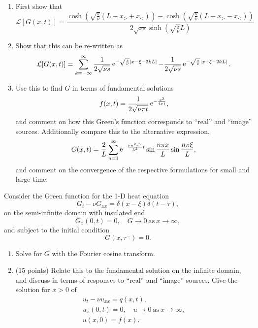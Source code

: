 {\begin{Exercise}
  \begin{enumerate} 
  \item 
    First show that 
    \[ 
    \mathcal{L}[G(x,t)] = \frac{  
      \cosh \left( \sqrt{ \frac{s}{\nu} } (L - x_> + x_<) \right)
      - \cosh \left( \sqrt{ \frac{s}{\nu} } (L - x_> - x_<) \right) }
    { 2 \sqrt{\nu s} \sinh \left( \sqrt{ \frac{s}{\nu} } L \right) }
    \]
    
  \item 
    Show that this can be re-written as 
    \[ 
    \mathcal{L}[G(x,t)] = \sum_{k=-\infty}^{\infty} \frac{1}{2 \sqrt{\nu s}} \mathop{\mathrm{e}}\nolimits^{- \sqrt{\frac{s}{\nu}}|x-\xi-2kL|} 
    - \frac{1}{2 \sqrt{\nu s}} \mathop{\mathrm{e}}\nolimits^{- \sqrt{\frac{s}{\nu}}|x+\xi-2kL|}.
    \]

  \item 
    Use this to find $G$ in terms of fundamental solutions
    \[  
    f(x,t) = \frac{1}{2 \sqrt{\nu \pi t}} \mathop{\mathrm{e}}\nolimits^{-\frac{x^2}{4 \nu t}} ,
    \]
    and comment on how this Green's function corresponds to ``real'' and 
    ``image'' sources. Additionally compare this to the alternative 
    expression,
    \[ 
    G(x,t) = \frac{2}{L} \sum_{n=1}^{\infty} \mathop{\mathrm{e}}\nolimits^{-\frac{\nu n^2 \pi^2}{L^2} t} 
    \sin{\frac{n \pi x}{L}} \sin{\frac{n \pi \xi}{L}},
    \]
    and comment on the convergence of the respective formulations for small 
    and large time. 
  \end{enumerate} 
\end{Exercise}










\begin{Exercise}
  Consider the Green function for the 1-D heat equation 
  \[ 
  G_t - \nu G_{xx} = \delta(x-\xi) \delta(t-\tau), 
  \]
  on the semi-infinite domain with insulated end
  \[ 
  G_x(0,t) = 0, \quad G \to 0\ \mathrm{as}\ x \to \infty,
  \] 
  and subject to the initial condition
  \[ 
  G(x,\tau^-)=0 .
  \]

  \begin{enumerate} 
  \item 
    Solve for $G$ with the Fourier cosine transform.
  \item 
    (15 points) Relate this to the fundamental solution on the infinite domain, 
    and discuss in terms of responses to ``real'' and ``image'' sources. 
    Give the solution for $x > 0$ of
    \begin{gather*}
      u_t - \nu u_{xx} = q(x,t), 
      \\
      u_x(0,t) = 0, \quad u \to 0\ \mathrm{as}\ x \to \infty,
      \\
      u(x,0) = f(x).
    \end{gather*}
  \end{enumerate}
\end{Exercise}












}
